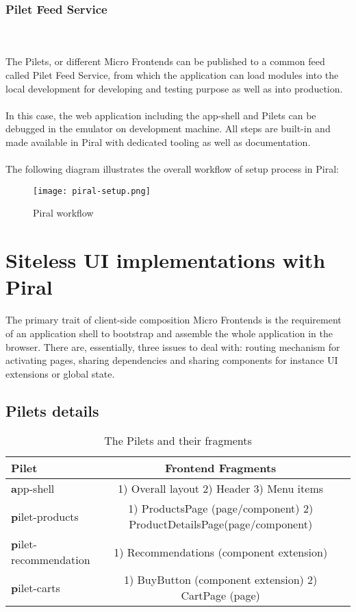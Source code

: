 \documentclass[a4paper]{book}
\begin{document}
\subsubsection{Pilet Feed Service }
\\ \\
The Pilets, or different Micro Frontends can be published to a common feed called Pilet Feed Service, from which the application can load modules into the local development for developing and testing purpose as well as into production.
\\ \\
In this case, the web application including the app-shell and Pilets can be debugged in the emulator on development machine. All steps are built-in and made available in Piral with dedicated tooling as well as documentation.
\\ \\
The following diagram illustrates the overall workflow of setup process in Piral:
\clearpage
\begin{figure}[h!]
  \centering
  \captionsetup{justification=centering}
  \texttt{[image: piral-setup.png]}
  \caption{Piral workflow}
  \label{fig:piral-setup}
\end{figure}

\section{Siteless UI implementations with Piral}
The primary trait of client-side composition Micro Frontends is the requirement of an application shell to bootstrap and assemble the whole application in the browser. There are, essentially, three issues to deal with: routing mechanism for activating pages, sharing dependencies and sharing components for instance UI extensions or global state. 

\subsection{Pilets details}

\begin{table}[h!]
    \captionsetup{justification=centering}
    \caption{The Pilets and their fragments}
    \label{tab:example_1}
    \centering
    \begin{tabular}{l | cc}
	\toprule
			\textbf{Pilet} & \textbf{Frontend Fragments}\\
	\midrule
	\textbf app-shell & 1) Overall layout 2) Header 3) Menu items 	\\
	\textbf pilet-products              & 1) ProductsPage (page/component) 2) ProductDetailsPage(page/component)\\
	\textbf pilet-recommendation             & 1) Recommendations (component extension)\\
	\textbf pilet-carts              & 1) BuyButton (component extension) 2) CartPage (page)\\
	\bottomrule
    \end{tabular}
\end{table}
\end{document}
